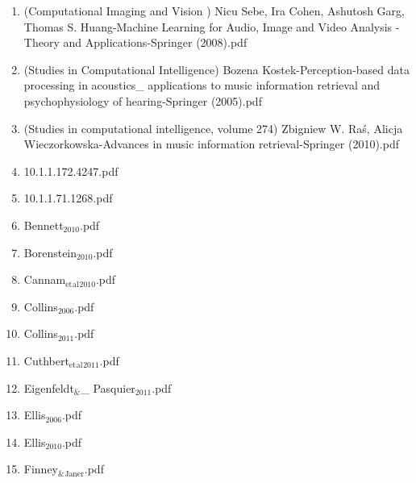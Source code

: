 \documentclass[11pt]{article}
\begin{document}
\begin{enumerate}
\begin{enumerate}
\begin{enumerate}
\begin{enumerate}
\begin{enumerate}
\item (Computational Imaging and Vision ) Nicu Sebe, Ira Cohen, Ashutosh Garg, Thomas S. Huang-Machine Learning for Audio, Image and Video Analysis - Theory and Applications-Springer (2008).pdf
\label{sec-1-1-1-1-7-2-1-2}

\item (Studies in Computational Intelligence) Bozena Kostek-Perception-based data processing in acoustics\_ applications to music information retrieval and psychophysiology of hearing-Springer (2005).pdf
\label{sec-1-1-1-1-7-2-1-3}

\item (Studies in computational intelligence, volume 274) Zbigniew W. Raś, Alicja Wieczorkowska-Advances in music information retrieval-Springer (2010).pdf
\label{sec-1-1-1-1-7-2-1-4}

\item 10.1.1.172.4247.pdf
\label{sec-1-1-1-1-7-2-1-5}

\item 10.1.1.71.1268.pdf
\label{sec-1-1-1-1-7-2-1-6}

\item Bennett$_{\text{2010}}$.pdf
\label{sec-1-1-1-1-7-2-1-7}

\item Borenstein$_{\text{2010}}$.pdf
\label{sec-1-1-1-1-7-2-1-8}

\item Cannam$_{\text{et}}$$_{\text{al}}$$_{\text{2010}}$.pdf
\label{sec-1-1-1-1-7-2-1-9}

\item Collins$_{\text{2006}}$.pdf
\label{sec-1-1-1-1-7-2-1-10}

\item Collins$_{\text{2011}}$.pdf
\label{sec-1-1-1-1-7-2-1-11}

\item Cuthbert$_{\text{et}}$$_{\text{al}}$$_{\text{2011}}$.pdf
\label{sec-1-1-1-1-7-2-1-12}

\item Eigenfeldt$_{\text{\&}}$\_ Pasquier$_{\text{2011}}$.pdf
\label{sec-1-1-1-1-7-2-1-13}

\item Ellis$_{\text{2006}}$.pdf
\label{sec-1-1-1-1-7-2-1-14}

\item Ellis$_{\text{2010}}$.pdf
\label{sec-1-1-1-1-7-2-1-15}

\item Finney$_{\text{\&}}$$_{\text{Janer}}$.pdf
\label{sec-1-1-1-1-7-2-1-16}


\end{enumerate}
\end{enumerate}
\end{enumerate}
\end{enumerate}
\end{enumerate}
\end{document}
